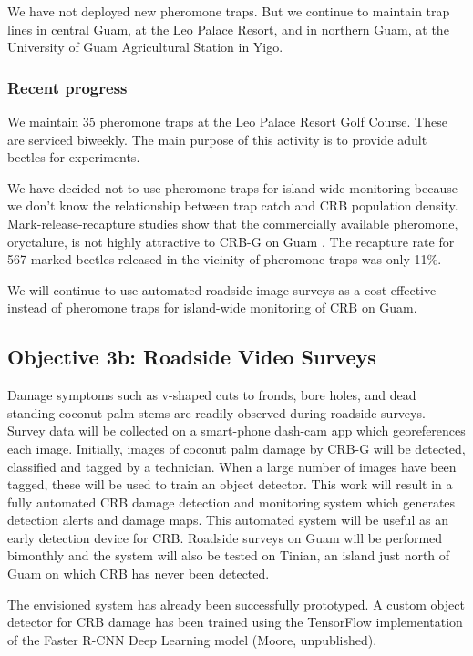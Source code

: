 \documentclass[12pt,letterpaper,english,bibliography=totocnumbered, abstract=on]{scrartcl}
\begin{document}
We have not deployed new pheromone traps. But we continue to maintain trap lines in central Guam, at the Leo Palace Resort, and in northern Guam, at the University of Guam Agricultural Station in Yigo.

\subsubsection{Recent progress}

We maintain 35 pheromone traps at the Leo Palace Resort Golf Course. These are serviced biweekly. The main purpose of this activity is to provide adult beetles for experiments.

We have decided not to use pheromone traps for island-wide monitoring because we don't know the relationship between trap catch and CRB population density. Mark-release-recapture studies show that the commercially available pheromone, oryctalure, is not highly attractive to CRB-G on Guam \cite{siderhurstEffectsUltravioletLight2021}. The recapture rate for 567 marked beetles released in the vicinity of pheromone traps was only 11\%.

We will continue to use automated roadside image surveys as a cost-effective instead of pheromone traps for island-wide monitoring of CRB on Guam. 

\clearpage
\subsection{Objective 3b: Roadside Video Surveys}

\begin{framed}
Damage symptoms such as v-shaped cuts to fronds, bore holes, and dead standing coconut palm stems are readily observed during roadside surveys. Survey data will be collected on a smart-phone dash-cam app which georeferences each image. Initially, images of coconut palm damage by CRB-G will be detected, classified and tagged by a technician. When a large number of images have been tagged, these will be used to train an object detector. This work will result in a fully automated CRB damage detection and monitoring system which generates detection alerts and damage maps. This automated system will be useful as an early detection device for CRB. Roadside surveys on Guam will be performed bimonthly and the system will also be tested on Tinian, an island just north of Guam on which CRB has never been detected.

The envisioned system has already been successfully prototyped. A custom object detector for CRB damage has been trained using the TensorFlow implementation of the Faster R-CNN Deep Learning model (Moore, unpublished).
\end{framed}
\end{document}
